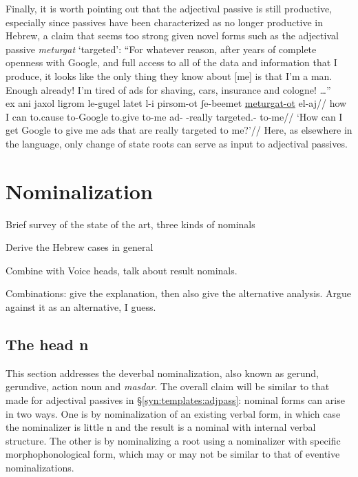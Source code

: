 Finally, it is worth pointing out that {the adjectival passive} is still productive, especially since passives have been characterized as no longer productive in Hebrew, a claim that seems too strong given novel forms such as{ the adjectival passive} \emph{meturgat} `targeted':
\ex ``For whatever reason, after years of complete openness with Google, and full access to all of the data and information that I produce, it looks like the only thing they know about [me] is that I'm a man. Enough already! I'm tired of ads for shaving, cars, insurance and cologne! \dots ''\\
	\begingl
		\gla ex ani jaxol ligrom le-gugel latet l-i pirsom-ot ʃe-beemet \underline{meturgat-ot} el-aj//
		\glb how I can to.cause to-Google to.give to-me ad- -really targeted.- to-me//
		\glft `How can I get Google to give me ads that are really targeted to me?'//
	\endgl
\xe
Here, as elsewhere in the language, only change of state roots can serve as input to adjectival passives.



\section{Nominalization} \label{passn:n}
Brief survey of the state of the art, three kinds of nominals

Derive the Hebrew cases in general

Combine with Voice heads, talk about result nominals.

Combinations: give the \cite{ahdoutkastner18} explanation, then also give the {\vz} alternative analysis. Argue against it as an alternative, I guess.


	\subsection{The head n}
This section addresses the deverbal nominalization, also known as gerund, gerundive, action noun and \emph{masdar}. The overall claim will be similar to that made for adjectival passives in \S\ref{syn:templates:adjpass}: nominal forms can arise in two ways. One is by nominalization of an existing verbal form, in which case the nominalizer is little n and the result is a nominal with internal verbal structure. The other is by nominalizing a root using a nominalizer with specific morphophonological form, which may or may not be similar to that of eventive nominalizations.

